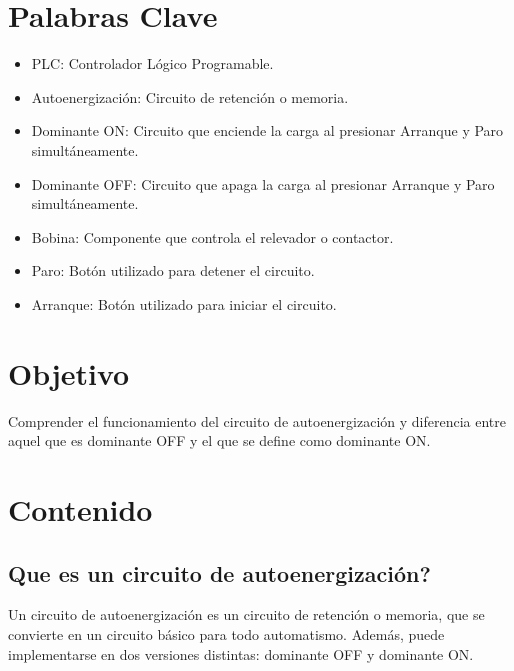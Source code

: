 \documentclass[12pt]{report}
\begin{document}
\tableofcontents
\newpage

\chapter*{Palabras Clave}
\begin{itemize}
  \item PLC: Controlador Lógico Programable.
  \item Autoenergización: Circuito de retención o memoria.
  \item Dominante ON: Circuito que enciende la carga al presionar Arranque y Paro simultáneamente.
  \item Dominante OFF: Circuito que apaga la carga al presionar Arranque y Paro simultáneamente.
  \item Bobina: Componente que controla el relevador o contactor.
  \item Paro: Botón utilizado para detener el circuito.
  \item Arranque: Botón utilizado para iniciar el circuito.
\end{itemize}
\newpage

\chapter*{Objetivo}
Comprender el funcionamiento del circuito de autoenergización y diferencia entre aquel que es dominante OFF y el que se define como dominante ON.
\newpage

\chapter{Contenido}
\section{Que es un circuito de autoenergización?}
Un circuito de autoenergización es un circuito de retención o memoria, que se convierte en un circuito básico para todo automatismo. Además, puede implementarse en dos versiones distintas: dominante OFF y dominante ON.
\end{document}
